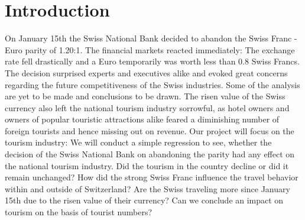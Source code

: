 \documentclass[12pt,a4paper,bibliography=totocnumbered,listof=totocnumbered]{scrartcl}
\begin{document}

\section{Introduction}



On January 15th the Swiss National Bank decided to abandon the Swiss Franc - Euro parity of 1.20:1. The financial markets reacted immediately: The exchange rate fell drastically and a Euro temporarily was worth less than 0.8 Swiss Francs. The decision surprised experts and executives alike and evoked great concerns regarding the future competitiveness of the Swiss industries. Some of the analysis are yet to be made and conclusions to be drawn. The risen value of the Swiss currency also left the national tourism industry sorrowful, as hotel owners and owners of popular touristic attractions alike feared a diminishing number of foreign tourists and hence missing out on revenue. Our project will focus on the tourism industry: We will conduct a simple regression to see, whether the decision of the Swiss National Bank on abandoning the parity had any effect on the national tourism industry. Did the tourism in the country decline or did it remain unchanged? How did the strong Swiss Franc influence the travel behavior within and outside of Switzerland? Are the Swiss traveling more since January 15th due to the risen value of their currency? Can we conclude an impact on tourism on the basis of tourist numbers? 
\end{document}
